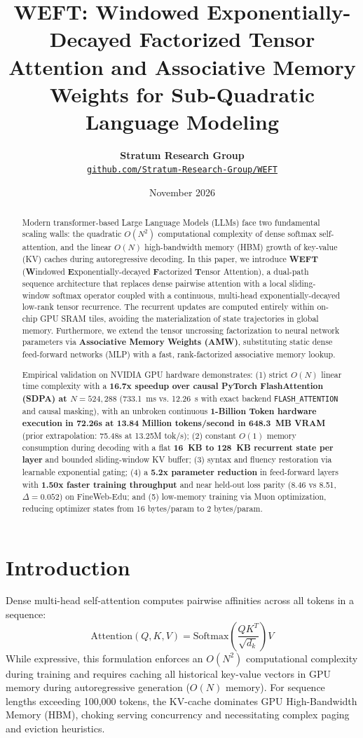 \documentclass[11pt,a4paper]{article}
\title{\textbf{WEFT: Windowed Exponentially-Decayed Factorized Tensor Attention and Associative Memory Weights for Sub-Quadratic Language Modeling}}
\author{
  \textbf{Stratum Research Group} \\
  \texttt{\href{https://github.com/Stratum-Research-Group/WEFT}{github.com/Stratum-Research-Group/WEFT}}
}
\date{November 2026}
\begin{document}
\maketitle

\begin{abstract}
Modern transformer-based Large Language Models (LLMs) face two fundamental scaling walls: the quadratic $O(N^2)$ computational complexity of dense softmax self-attention, and the linear $O(N)$ high-bandwidth memory (HBM) growth of key-value (KV) caches during autoregressive decoding. In this paper, we introduce \textbf{WEFT} (\textbf{W}indowed \textbf{E}xponentially-decayed \textbf{F}actorized \textbf{T}ensor Attention), a dual-path sequence architecture that replaces dense pairwise attention with a local sliding-window softmax operator coupled with a continuous, multi-head exponentially-decayed low-rank tensor recurrence. The recurrent updates are computed entirely within on-chip GPU SRAM tiles, avoiding the materialization of state trajectories in global memory. Furthermore, we extend the tensor uncrossing factorization to neural network parameters via \textbf{Associative Memory Weights (AMW)}, substituting static dense feed-forward networks (MLP) with a fast, rank-factorized associative memory lookup.

Empirical validation on NVIDIA GPU hardware demonstrates: (1) strict $O(N)$ linear time complexity with a \textbf{16.7x speedup over causal PyTorch FlashAttention (SDPA) at $N = 524{,}288$} (733.1~ms vs. 12.26~s with exact backend \texttt{FLASH\_ATTENTION} and causal masking), with an unbroken continuous \textbf{1-Billion Token hardware execution in 72.26s at 13.84 Million tokens/second in 648.3~MB VRAM} (prior extrapolation: 75.48s at 13.25M tok/s); (2) constant $O(1)$ memory consumption during decoding with a flat \textbf{16~KB to 128~KB recurrent state per layer} and bounded sliding-window KV buffer; (3) syntax and fluency restoration via learnable exponential gating; (4) a \textbf{5.2x parameter reduction} in feed-forward layers with \textbf{1.50x faster training throughput} and near held-out loss parity (8.46 vs 8.51, $\Delta=0.052$) on FineWeb-Edu; and (5) low-memory training via Muon optimization, reducing optimizer states from 16 bytes/param to 2 bytes/param.
\end{abstract}

\section{Introduction}
Dense multi-head self-attention computes pairwise affinities across all tokens in a sequence:
\begin{equation}
\text{Attention}(Q, K, V) = \text{Softmax}\left(\frac{Q K^T}{\sqrt{d_k}}\right) V
\end{equation}
While expressive, this formulation enforces an $O(N^2)$ computational complexity during training and requires caching all historical key-value vectors in GPU memory during autoregressive generation ($O(N)$ memory). For sequence lengths exceeding 100,000 tokens, the KV-cache dominates GPU High-Bandwidth Memory (HBM), choking serving concurrency and necessitating complex paging and eviction heuristics.
\end{document}
